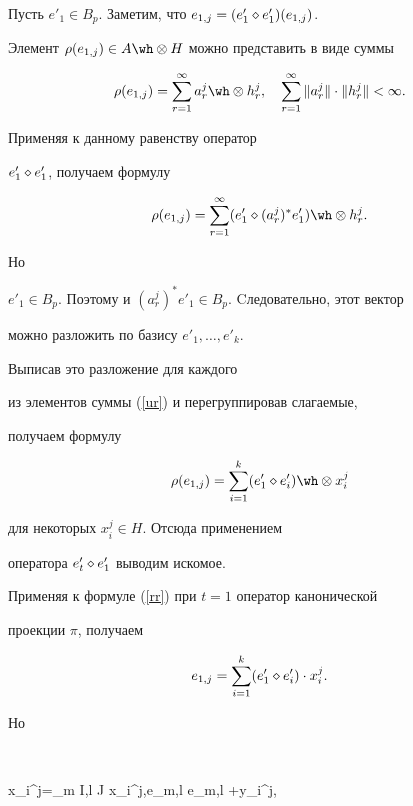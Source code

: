 \begin{pf}


Пусть $e'_1 \in B_p$. Заметим, что $e_{1,j}=(e'_1 \diamond e'_1)(e_{1,j})$.


Элемент $\rho (e_ {1,j}) \in


A \tens H$ можно представить в виде суммы


$$


\rho (e_{1,j})= \sumr a_r^j \tens


h_r^j,\quad \sumr \| a_r^j\| \cd \| h_r^j\| < \infty.


$$


Применяя к данному равенству оператор


$e'_1 \diamond e'_1$, получаем формулу


\begin {equation}


\label{ur}


\rho (e_{1,j}) =\sumr (e'_1 \dia (a_r^j)^* e'_1) \tens h_r^j.


\end {equation}


Но


$e'_1 \in B_p$. Поэтому и $(a_r^j)^* e'_1 \in B_p$. Cледовательно, этот вектор


можно разложить по базису $e'_1,\dotsc,e'_k$.


Выписав это разложение для каждого


из элементов суммы (\ref{ur}) и перегруппировав слагаемые,


получаем формулу


$$


\rho (e_{1,j})=\sumk (e'_1 \dia e'_i) \tens x_i^j


$$


для некоторых $x_i^j \in H$. Отсюда применением


оператора $e'_t \diamond e'_1$ выводим искомое.


\end{pf}





Применяя к формуле (\ref{rr}) при $t=1$ оператор канонической


проекции $\pi$, получаем


$$


e_{1,j}= \sumk (e'_1 \dia e'_i) \cd x_i^j.


$$


Но


$$


x_i^j=\sum_{m \in I,l \in J} \lan x_i^j,e_{m,l} \ran e_{m,l} +y_i^j,


